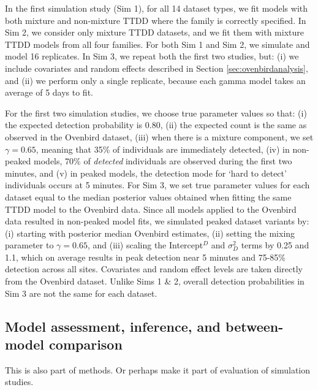 \documentclass[useAMS,usenatbib,referee,12pt]{article}
\newcommand{\jarad}[1]{{\color{red} #1}}
\begin{document}
In the first simulation study (Sim 1), for all 14 dataset types, we fit models with both mixture and non-mixture TTDD where the family is correctly specified.  In Sim 2, we consider only mixture TTDD datasets, and we fit them with mixture TTDD models from all four families.  For both Sim 1 and Sim 2, we simulate and model 16 replicates.  In Sim 3, we repeat both the first two studies, but: (i) we include covariates and random effects described in Section \ref{sec:ovenbirdanalysis}, and (ii) we perform only a single replicate, because each gamma model takes an average of 5 days to fit.

For the first two simulation studies, we choose true parameter values so that: (i) the expected detection probability is 0.80, (ii) the expected count is the same as observed in the Ovenbird dataset, (iii) when there is a mixture component, we set $\gamma = 0.65$, meaning that 35\% of individuals are immediately detected, (iv) in non-peaked models, 70\% of \textit{detected} individuals are observed during the first two minutes, and (v) in peaked models, the detection mode for `hard to detect' individuals occurs at 5 minutes.  For Sim 3, we set true parameter values for each dataset equal to the median posterior values obtained when fitting the same TTDD model to the Ovenbird data.  Since all models applied to the Ovenbird data resulted in non-peaked model fits, we simulated peaked dataset variants by: (i) starting with posterior median Ovenbird estimates, (ii) setting the mixing parameter to $\gamma = 0.65$, and (iii) scaling the Intercept$^D$ and $\sigma_D^2$ terms by 0.25 and 1.1, which on average results in peak detection near 5 minutes and 75-85\% detection across all sites.  Covariates and random effect levels are taken directly from the Ovenbird dataset.  Unlike Sims 1 \& 2, overall detection probabilities in Sim 3 are not the same for each dataset.





\subsection{Model assessment, inference, and between-model comparison}

\jarad{This is also part of methods. Or perhaps make it part of evaluation of simulation studies.}
\end{document}
